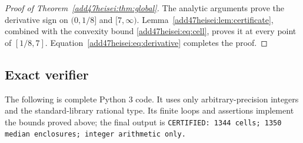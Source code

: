 \documentclass[11pt,a4paper]{article}
\numberwithin{equation}{section}
\theoremstyle{definition}
\theoremstyle{remark}
\begin{document}
\begin{proof}[Proof of Theorem~\ref{add47heisei:thm:global}]
The analytic arguments prove the derivative sign on $(0,1/8]$ and
$[7,\infty)$. Lemma~\ref{add47heisei:lem:certificate}, combined with the convexity
bound \eqref{add47heisei:eq:cell}, proves it at every point of $[1/8,7]$.
Equation~\eqref{add47heisei:eq:derivative} completes the proof.
\end{proof}

\subsection{Exact verifier}
The following is complete Python 3 code. It uses only arbitrary-precision
integers and the standard-library rational type. Its finite loops and
assertions implement the bounds proved above; the final output is
\texttt{CERTIFIED: 1344 cells; 1350 median enclosures; integer arithmetic only.}
\end{document}

